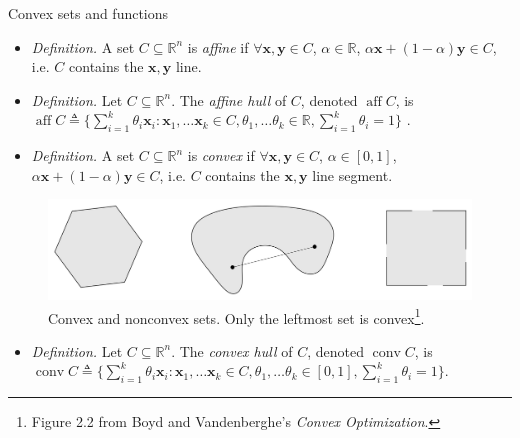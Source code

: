 \documentclass{beamer}
\numberwithin{equation}{section}
\begin{document}
\begin{frame}{Convex sets and functions}
    \begin{itemize}
        \item
        \textit{Definition.} A set $ C \subseteq \mathbb{R}^n $ is
        \textit{affine} if $ \forall \mathbf{x}, \mathbf{y} \in C $,
        $ \alpha \in \mathbb{R} $, $ \alpha\mathbf{x} + (1 - \alpha)\mathbf{y}
        \in C $, i.e. $ C $ contains the $ \mathbf{x}, \mathbf{y} $ line.

        \item
        \textit{Definition.} Let $ C \subseteq \mathbb{R}^n $. The
        \textit{affine hull} of $ C $, denoted $ \operatorname{aff} C $, is
        $ \operatorname{aff} C \triangleq \{
            \sum_{i = 1}^k\theta_i\mathbf{x}_i : \mathbf{x}_1, \ldots
            \mathbf{x}_k \in C, \theta_1, \ldots \theta_k \in \mathbb{R},
            \sum_{i = 1}^k\theta_i = 1
        \} $ \cite{bv_convex_opt}.

        \item
        \textit{Definition.} A set $ C \subseteq \mathbb{R}^n $ is
        \textit{convex} if $ \forall \mathbf{x}, \mathbf{y} \in C $,
        $ \alpha \in [0, 1] $,
        $ \alpha\mathbf{x} + (1 - \alpha)\mathbf{y} \in C $, i.e. $ C $
        contains the $ \mathbf{x}, \mathbf{y} $ line segment.
    \end{itemize}
    \begin{figure}
        \centering
        \includegraphics[scale = 0.2]{bv_fig_2.2.png}
        \vspace{-10 pt}
        \caption{
            Convex and nonconvex sets. Only the leftmost set is
            convex\footnote{
                Figure 2.2 from Boyd and Vandenberghe's
                \textit{Convex Optimization}.
            }.
        }
        \vspace{-10 pt}
    \end{figure}
    \begin{itemize}
        \item
        \textit{Definition.} Let $ C \subseteq \mathbb{R}^n $. The
        \textit{convex hull} of $ C $, denoted $ \operatorname{conv} C $, is
        $ \operatorname{conv} C \triangleq \{
            \sum_{i = 1}^k\theta_i\mathbf{x}_i : \mathbf{x}_1, \ldots
            \mathbf{x}_k \in C, \theta_1, \ldots \theta_k \in [0, 1],
            \sum_{i = 1}^k\theta_i = 1        
        \} $.
    \end{itemize}
    \bigskip
\end{frame}
\end{document}
